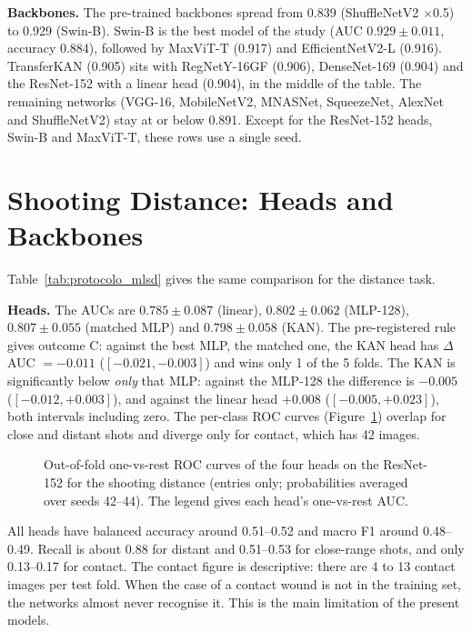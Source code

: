 \textbf{Backbones.} The pre-trained backbones spread from 0.839 (ShuffleNetV2 $\times$0.5) to 0.929 (Swin-B). Swin-B is the best model of the study (AUC $0.929 \pm 0.011$, accuracy 0.884), followed by MaxViT-T (0.917) and EfficientNetV2-L (0.916). TransferKAN (0.905) sits with RegNetY-16GF (0.906), DenseNet-169 (0.904) and the ResNet-152 with a linear head (0.904), in the middle of the table. The remaining networks (VGG-16, MobileNetV2, MNASNet, SqueezeNet, AlexNet and ShuffleNetV2) stay at or below 0.891. Except for the ResNet-152 heads, Swin-B and MaxViT-T, these rows use a single seed.

\section{Shooting Distance: Heads and Backbones}
\label{sec:results_mlsd}

Table~\ref{tab:protocolo_mlsd} gives the same comparison for the distance task.



\textbf{Heads.} The AUCs are $0.785 \pm 0.087$ (linear), $0.802 \pm 0.062$ (MLP-128), $0.807 \pm 0.055$ (matched MLP) and $0.798 \pm 0.058$ (KAN). The pre-registered rule gives outcome C: against the best MLP, the matched one, the KAN head has $\Delta$AUC $= -0.011$ ($[-0.021, -0.003]$) and wins only 1 of the 5 folds. The KAN is significantly below \emph{only} that MLP: against the MLP-128 the difference is $-0.005$ ($[-0.012, +0.003]$), and against the linear head $+0.008$ ($[-0.005, +0.023]$), both intervals including zero. The per-class ROC curves (Figure~\ref{fig:roc_mlsd}) overlap for close and distant shots and diverge only for contact, which has 42 images.

\begin{figure}[!htbp]
\centering

\caption{Out-of-fold one-vs-rest ROC curves of the four heads on the ResNet-152 for the shooting distance (entries only; probabilities averaged over seeds 42--44). The legend gives each head's one-vs-rest AUC.}
\label{fig:roc_mlsd}
\end{figure}

All heads have balanced accuracy around 0.51--0.52 and macro F1 around 0.48--0.49. Recall is about 0.88 for distant and 0.51--0.53 for close-range shots, and only 0.13--0.17 for contact. The contact figure is descriptive: there are 4 to 13 contact images per test fold. When the case of a contact wound is not in the training set, the networks almost never recognise it. This is the main limitation of the present models.

